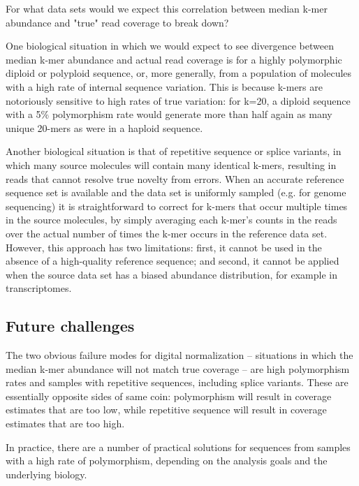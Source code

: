 \documentclass[10pt,draft]{article}
\begin{document}
For what data sets would we expect this correlation between median
k-mer abundance and "true" read coverage to break down?

One biological situation in which we would expect to see divergence
between median k-mer abundance and actual read coverage is for a
highly polymorphic diploid or polyploid sequence, or, more generally,
from a population of molecules with a high rate of internal sequence
variation.  This is because k-mers are notoriously sensitive to high
rates of true variation: for k=20, a diploid sequence with a 5\%
polymorphism rate would generate more than half again as many unique
20-mers as were in a haploid sequence.

Another biological situation is that of repetitive sequence or splice
variants, in which many source molecules will contain many identical
k-mers, resulting in reads that cannot resolve true novelty from errors.  When an accurate reference sequence set is available and the
data set is uniformly sampled (e.g. for genome sequencing) it is
straightforward to correct for k-mers that occur multiple times in the
source molecules, by simply averaging each k-mer's counts in the reads
over the actual number of times the k-mer occurs in the reference data
set.  However, this approach has two limitations: first, it cannot be
used in the absence of a high-quality reference sequence; and second,
it cannot be applied when the source data set has a biased abundance
distribution, for example in transcriptomes.


\subsection*{Future challenges}

The two obvious failure modes for digital normalization -- situations
in which the median k-mer abundance will not match true coverage --
are high polymorphism rates and samples with repetitive sequences,
including splice variants.  These are essentially opposite sides of
same coin: polymorphism will result in coverage estimates that are too
low, while repetitive sequence will result in coverage estimates that
are too high.

In practice, there are a number of practical solutions for sequences
from samples with a high rate of polymorphism, depending on the
analysis goals and the underlying biology.
\end{document}
